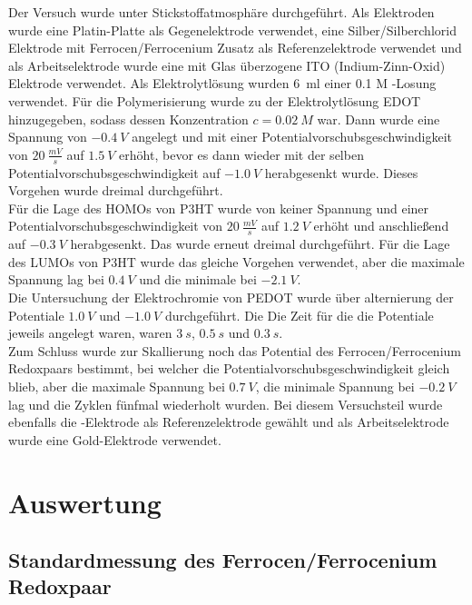 \documentclass[10pt,a4paper,ngerman]{scrartcl}
\begin{document}
	Der Versuch wurde unter Stickstoffatmosphäre durchgeführt. Als Elektroden wurde eine Platin-Platte als Gegenelektrode verwendet, 
	eine Silber/Silberchlorid Elektrode mit Ferrocen/Ferrocenium Zusatz als Referenzelektrode verwendet und 
	als Arbeitselektrode wurde eine mit Glas überzogene ITO (Indium-Zinn-Oxid) Elektrode verwendet.
	Als Elektrolytlösung wurden \SI{6}{ml} einer 0.1 M -Losung verwendet. 
	Für die Polymerisierung wurde zu der Elektrolytlösung EDOT hinzugegeben, sodass dessen Konzentration $c = \SI{0,02}{M}$ war.
	Dann wurde eine Spannung von $\SI{-0,4}{V}$ angelegt und mit einer Potentialvorschubsgeschwindigkeit von $\SI{20}{\frac{mV}{s}}$ auf 
	$\SI{1,5}{V}$ erhöht, bevor es dann wieder mit der selben Potentialvorschubsgeschwindigkeit auf $\SI{-1,0}{V}$ herabgesenkt wurde. Dieses 
	Vorgehen wurde dreimal durchgeführt. \\
	Für die Lage des HOMOs von P3HT wurde von keiner Spannung und einer Potentialvorschubsgeschwindigkeit von $\SI{20}{\frac{mV}{s}}$ auf 
	$\SI{1,2}{V}$ erhöht und anschließend auf $\SI{-0,3}{V}$ herabgesenkt. Das wurde erneut dreimal durchgeführt. Für die Lage des LUMOs von 
	P3HT wurde das gleiche Vorgehen verwendet, aber die maximale Spannung lag bei $\SI{0,4}{V}$ und die minimale bei $\SI{-2,1}{V}$.\\
	Die Untersuchung der Elektrochromie von PEDOT wurde über alternierung der Potentiale $\SI{1,0}{V}$ und $\SI{-1,0}{V}$ durchgeführt. Die 
	Die Zeit für die die Potentiale jeweils angelegt waren, waren $\SI{3}{s}$, $\SI{0,5}{s}$ und $\SI{0,3}{s}$.\\
	Zum Schluss wurde zur Skallierung noch das Potential des Ferrocen/Ferrocenium Redoxpaars bestimmt, bei welcher die Potentialvorschubsgeschwindigkeit 
	gleich blieb, aber die maximale Spannung bei $\SI{0,7}{V}$, die minimale Spannung bei $\SI{-0,2}{V}$ lag und die Zyklen fünfmal wiederholt 
	wurden. Bei diesem Versuchsteil wurde ebenfalls die -Elektrode als Referenzelektrode gewählt und als Arbeitselektrode wurde eine 
	Gold-Elektrode verwendet.
	
\section{Auswertung}

	\subsection{Standardmessung des Ferrocen/Ferrocenium Redoxpaar}
\end{document}

